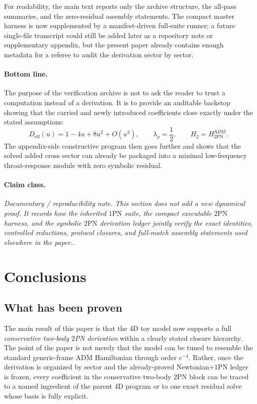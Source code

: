 \documentclass[11pt]{article}
\newcommand{\OnePN}{\mathrm{1PN}}
\newcommand{\TwoPN}{\mathrm{2PN}}
\newcommand{\ADM}{\mathrm{ADM}}
\newcommand{\eff}{\mathrm{eff}}
\newcommand{\claimclass}[1]{\paragraph{Claim class.}\emph{#1.}}
\begin{document}
For readability, the main text reports only the archive structure, the all-pass summaries,
and the zero-residual assembly statements.
The compact master harness is now supplemented by a manifest-driven full-suite runner;
a future single-file transcript could still be added later as a repository note or
supplementary appendix, but the present paper already contains enough metadata for a
referee to audit the derivation sector by sector.

\paragraph{Bottom line.}
The purpose of the verification archive is not to ask the reader to trust a computation
instead of a derivation.
It is to provide an auditable backstop showing that the carried and newly introduced
coefficients close exactly under the stated assumptions:
\begin{equation}
D_{\eff}(u)=1-4u+8u^2+O(u^3),
\qquad
\lambda_\rho=\frac12,
\qquad
H_2=H^{\ADM}_{2\mathrm{PN}}.
\label{eq:verification-bottom-line-2pn}
\end{equation}
The appendix-side constructive program then goes further and shows that the solved added
cross sector can already be packaged into a minimal low-frequency throat-response module
with zero symbolic residual.

\claimclass{Documentary / reproducibility note.  This section does not add a new dynamical
proof.  It records how the inherited \(\OnePN\) suite, the compact executable \(\TwoPN\)
harness, and the symbolic \(\TwoPN\) derivation ledger jointly verify the exact
identities, controlled reductions, protocol closures, and full-match assembly statements
used elsewhere in the paper.}

\section{Conclusions}
\label{sec:conclusion}

\subsection{What has been proven}
\label{sec:conclusion-proven}

The main result of this paper is that the \(4\)D toy model now supports a full
\emph{conservative two-body \(2\)PN derivation} within a clearly stated closure
hierarchy.
The point of the paper is not merely that the model can be tuned to resemble the
standard generic-frame \(\ADM\) Hamiltonian through order \(c^{-4}\).
Rather, once the derivation is organized by sector and the already-proved
Newtonian+\(\OnePN\) ledger is frozen, every coefficient in the conservative
two-body \(\TwoPN\) block can be traced to a named ingredient of the parent
\(4\)D program or to one exact residual solve whose basis is fully explicit.
\end{document}
